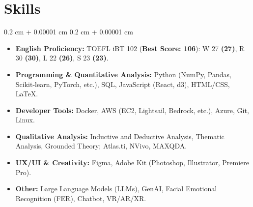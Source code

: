 \documentclass[10pt, letterpaper]{article}
\newenvironment{highlights}{
    \begin{itemize}[
        topsep=0.10 cm,
        parsep=0.10 cm,
        partopsep=0pt,
        itemsep=0pt,
        leftmargin=0.4 cm + 10pt
    ]
}{
    \end{itemize}
} %
\newenvironment{onecolentry}{
    \begin{adjustwidth}{
        0.2 cm + 0.00001 cm
    }{
        0.2 cm + 0.00001 cm
    }
}{
    \end{adjustwidth}
} %
\newenvironment{twocolentry}[2][]{
    \onecolentry
    \def\secondColumn{#2}
    \setcolumnwidth{\fill, 4.5 cm}
    \begin{paracol}{2}
}{
    \switchcolumn \raggedleft \secondColumn
    \end{paracol}
    \endonecolentry
} %
\begin{document}


    \section{Skills}

        \begin{onecolentry}
            \begin{highlights}                
                \item \textbf{English Proficiency:} TOEFL iBT 102 (\textbf{Best Score: 106}): W 27 \textbf{(27)}, R 30 \textbf{(30)}, L 22 \textbf{(26)}, S 23 \textbf{(23)}.
                \item \textbf{Programming \& Quantitative Analysis:} Python (NumPy, Pandas, Scikit-learn, PyTorch, etc.), SQL, JavaScript (React, d3), HTML/CSS, LaTeX.
                \item \textbf{Developer Tools:} Docker, AWS (EC2, Lightsail, Bedrock, etc.), Azure, Git, Linux.
                \item \textbf{Qualitative Analysis:} Inductive and Deductive Analysis, Thematic Analysis, Grounded Theory; Atlas.ti, NVivo, MAXQDA.
                \item \textbf{UX/UI \& Creativity:} Figma, Adobe Kit (Photoshop, Illustrator, Premiere Pro).
                \item \textbf{Other:} Large Language Models (LLMs), GenAI, Facial Emotional Recognition (FER), Chatbot, VR/AR/XR.
            \end{highlights}
        \end{onecolentry}
\end{document}
